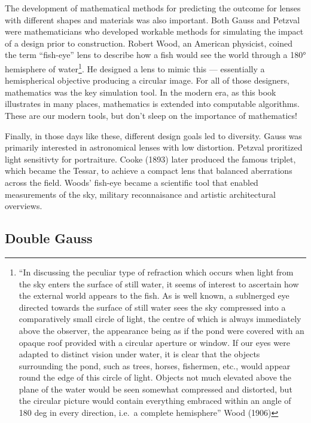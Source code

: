\documentclass[
  letterpaper,
]{book}
\begin{document}
The development of mathematical methods for predicting the outcome for
lenses with different shapes and materials was also important. Both
Gauss and Petzval were mathematicians who developed workable methods for
simulating the impact of a design prior to construction. Robert Wood, an
American physicist, coined the term ``fish-eye'' lens to describe how a
fish would see the world through a 180° hemisphere of water\footnote{``In
  discussing the peculiar type of refraction which occurs when light
  from the sky enters the surface of still water, it seems of interest
  to ascertain how the external world appears to the fish. As is well
  known, a sublnerged eye directed towards the surface of still water
  sees the sky compressed into a comparatively small circle of light,
  the centre of which is always immediately above the observer, the
  appearance being as if the pond were covered with an opaque roof
  provided with a circular aperture or window. If our eyes were adapted
  to distinct vision under water, it is clear that the objects
  surrounding the pond, such as trees, horses, fishermen, etc., would
  appear round the edge of this circle of light. Objects not much
  elevated above the plane of the water would be seen somewhat
  compressed and distorted, but the circular picture would contain
  everything embraced within an angle of 180 deg in every direction,
  i.e.~a complete hemisphere'' Wood (1906)}. He designed a lens to mimic
this --- essentially a hemispherical objective producing a circular
image. For all of those designers, mathematics was the key simulation
tool. In the modern era, as this book illustrates in many places,
mathematics is extended into computable algorithms. These are our modern
tools, but don't sleep on the importance of mathematics!

Finally, in those days like these, different design goals led to
diversity. Gauss was primarily interested in astronomical lenses with
low distortion. Petzval proritized light sensitivty for portraiture.
Cooke (1893) later produced the famous triplet, which became the Tessar,
to achieve a compact lens that balanced aberrations across the field.
Woods' fish-eye became a scientific tool that enabled measurements of
the sky, military reconnaisance and artistic architectural overviews.

\subsection{Double Gauss}\label{sec-optics-double-gauss}
\end{document}
